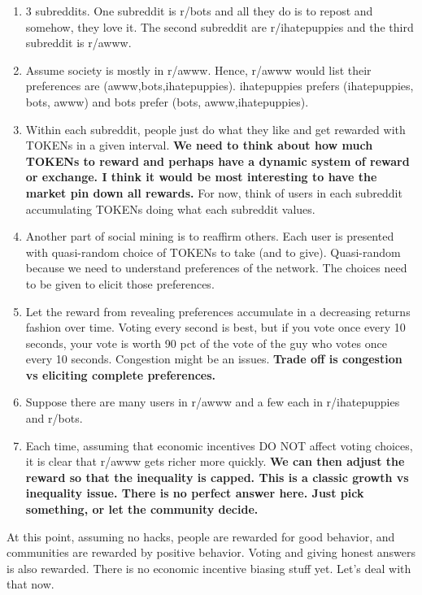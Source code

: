 \documentclass[12pt]{article}
\begin{document}
\begin{enumerate}
	\item 3 subreddits. One subreddit is r/bots and all they do is to repost and somehow, they love it. The second subreddit are r/ihatepuppies and the third subreddit is r/awww.
	
	\item Assume society is mostly in r/awww. Hence, r/awww would list their preferences are (awww,bots,ihatepuppies). ihatepuppies prefers (ihatepuppies, bots, awww) and bots prefer (bots, awww,ihatepuppies).
	
	\item Within each subreddit, people just do what they like and get rewarded with TOKENs in a given interval. \textbf{We need to think about how much TOKENs to reward and perhaps have a dynamic system of reward or exchange. I think it would be most interesting to have the market pin down all rewards.} For now, think of users in each subreddit accumulating TOKENs doing what each subreddit values.
	
	\item Another part of social mining is to reaffirm others. Each user is presented with quasi-random choice of TOKENs to take (and to give). Quasi-random because we need to understand preferences of the network. The choices need to be given to elicit those preferences. 
	
	\item Let the reward from revealing preferences accumulate in a decreasing returns fashion over time. Voting every second is best, but if you vote once every 10 seconds, your vote is worth 90 pct of the vote of the guy who votes once every 10 seconds. Congestion might be an issues. \textbf{Trade off is congestion vs eliciting complete preferences.}
	
	\item Suppose there are many users in r/awww and a few each in r/ihatepuppies and r/bots.
	
	\item Each time, assuming that economic incentives DO NOT affect voting choices, it is clear that r/awww gets richer more quickly. \textbf{We can then adjust the reward so that the inequality is capped. This is a classic growth vs inequality issue. There is no perfect answer here. Just pick something, or let the community decide.}
	
\end{enumerate}

At this point, assuming no hacks, people are rewarded for good behavior, and communities are rewarded by positive behavior. Voting and giving honest answers is also rewarded. There is no economic incentive biasing stuff yet. Let's deal with that now.
\end{document}
